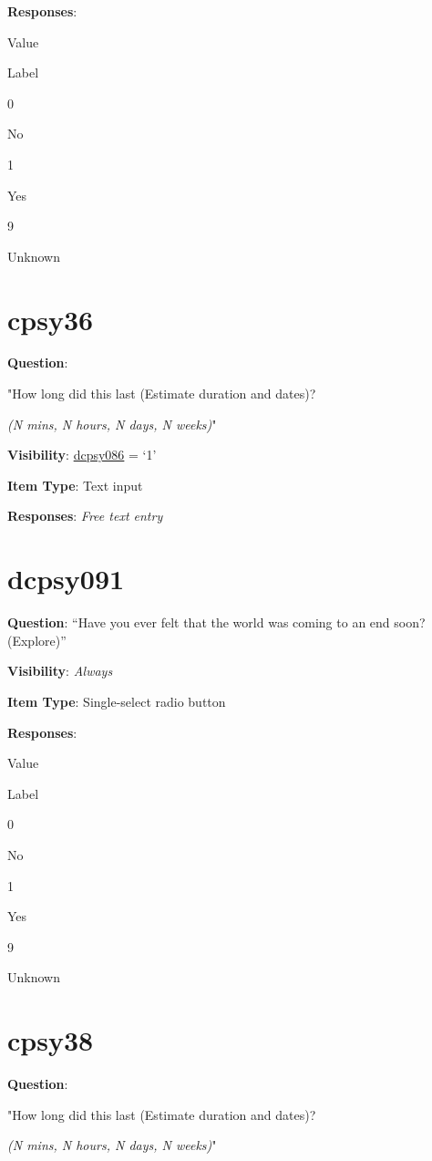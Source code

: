 \documentclass[]{book}
\begin{document}
\textbf{Responses}:

Value

Label

0

No

1

Yes

9

Unknown

\hypertarget{cpsy36}{%
\section{cpsy36}\label{cpsy36}}

\textbf{Question}:

"How long did this last (Estimate duration and dates)?

\emph{(N mins, N hours, N days, N weeks)}"

\textbf{Visibility}: \protect\hyperlink{dcpsy086}{dcpsy086} = `1'

\textbf{Item Type}: Text input

\textbf{Responses}: \emph{Free text entry}

\hypertarget{dcpsy091}{%
\section{dcpsy091}\label{dcpsy091}}

\textbf{Question}: ``Have you ever felt that the world was coming to an end soon? (Explore)''

\textbf{Visibility}: \emph{Always}

\textbf{Item Type}: Single-select radio button

\textbf{Responses}:

Value

Label

0

No

1

Yes

9

Unknown

\hypertarget{cpsy38}{%
\section{cpsy38}\label{cpsy38}}

\textbf{Question}:

"How long did this last (Estimate duration and dates)?

\emph{(N mins, N hours, N days, N weeks)}"
\end{document}
